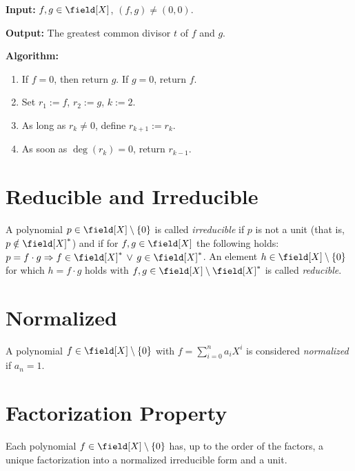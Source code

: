 \textbf{Input:} \(f, g \in \field[X]\), \((f, g) \neq (0,0)\).

\textbf{Output:} The greatest common divisor \(t\) of \(f\) and \(g\).

\textbf{Algorithm:}

\begin{enumerate}

    \item If \(f = 0\), then return \(g\). If \(g = 0\), return \(f\).

    \item Set \(r_1 := f\), \(r_2 := g\), \(k := 2\).

    \item As long as \(r_k \neq 0\), define \(r_{k+1} := r_k\).

    \item As soon as \(\deg(r_k) = 0\), return \(r_{k-1}\).

\end{enumerate}

\section{Reducible and Irreducible}

A polynomial \(p \in \field[X] \setminus \{0\}\) is called \emph{irreducible} if \(p\) is not a unit (that is, \(p \notin \field[X]^{\ast}\)) and if for 
\(f, g \in \field[X]\) the following holds: \(p = f \cdot g \Rightarrow f \in \field[X]^{\ast} \,\vee\, g \in \field[X]^{\ast}\). An element \(h \in \field[X] \setminus \{0\}\) for which 
\(h = f \cdot g\) holds with \(f, g \in \field[X] \setminus \field[X]^{\ast}\)  is called \emph{reducible}.

\section{Normalized}

A polynomial \(f \in \field[X] \setminus \{0\}\) with \(f = \sum_{i = 0}^{n} a_i X^i\) is considered \emph{normalized} if \(a_n = 1\).

\section{Factorization Property}

Each polynomial \(f \in \field[X] \setminus \{0\}\) has, up to the order of the factors, a unique factorization into a normalized irreducible form and 
a unit.